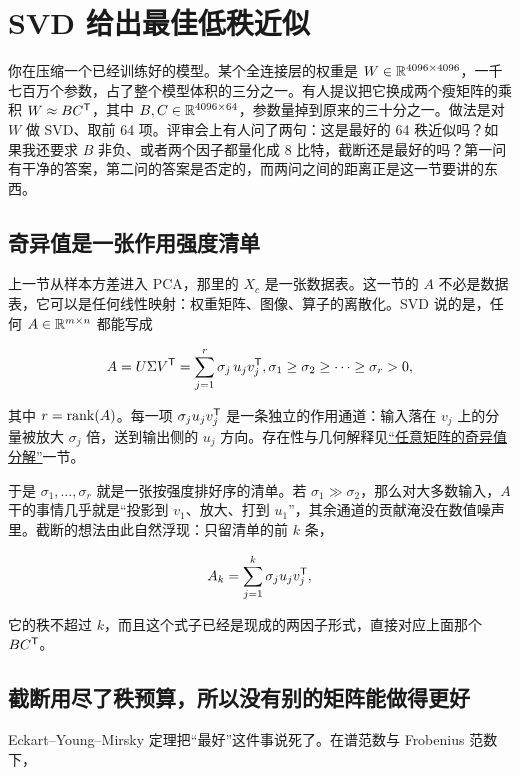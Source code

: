 \section{SVD 给出最佳低秩近似}
\label{sec:13-Machine-Learning/04-Dimensionality-Reduction/02}

你在压缩一个已经训练好的模型。某个全连接层的权重是 \(W\in\mathbb{R}^{4096\times 4096}\)，一千七百万个参数，占了整个模型体积的三分之一。有人提议把它换成两个瘦矩阵的乘积 \(W\approx BC^{\mathsf{T}}\)，其中 \(B,C\in\mathbb{R}^{4096\times 64}\)，参数量掉到原来的三十分之一。做法是对 \(W\) 做 SVD、取前 64 项。评审会上有人问了两句：这是最好的 64 秩近似吗？如果我还要求 \(B\) 非负、或者两个因子都量化成 8 比特，截断还是最好的吗？第一问有干净的答案，第二问的答案是否定的，而两问之间的距离正是这一节要讲的东西。

\subsection{奇异值是一张作用强度清单}

上一节从样本方差进入 PCA，那里的 \(X_c\) 是一张数据表。这一节的 \(A\) 不必是数据表，它可以是任何线性映射：权重矩阵、图像、算子的离散化。SVD 说的是，任何 \(A\in\mathbb{R}^{m\times n}\) 都能写成

\[
A = U\Sigma V^{\mathsf{T}} = \sum_{j=1}^{r}\sigma_j\,u_jv_j^{\mathsf{T}},
\space \sigma_1\ge\sigma_2\ge\cdots\ge\sigma_r>0,
\]

其中 \(r=\operatorname{rank}(A)\)。每一项 \(\sigma_ju_jv_j^{\mathsf{T}}\) 是一条独立的作用通道：输入落在 \(v_j\) 上的分量被放大 \(\sigma_j\) 倍，送到输出侧的 \(u_j\) 方向。存在性与几何解释见\hyperref[sec:03-Linear-Algebra/07-SVD-and-Data-Applications/01]{``任意矩阵的奇异值分解''}一节。

于是 \(\sigma_1,\dots,\sigma_r\) 就是一张按强度排好序的清单。若 \(\sigma_1\gg\sigma_2\)，那么对大多数输入，\(A\) 干的事情几乎就是``投影到 \(v_1\)、放大、打到 \(u_1\)''，其余通道的贡献淹没在数值噪声里。截断的想法由此自然浮现：只留清单的前 \(k\) 条，

\[
A_k = \sum_{j=1}^{k}\sigma_ju_jv_j^{\mathsf{T}},
\]

它的秩不超过 \(k\)，而且这个式子已经是现成的两因子形式，直接对应上面那个 \(BC^{\mathsf{T}}\)。

\subsection{截断用尽了秩预算，所以没有别的矩阵能做得更好}

Eckart--Young--Mirsky 定理把``最好''这件事说死了。在谱范数与 Frobenius 范数下，

